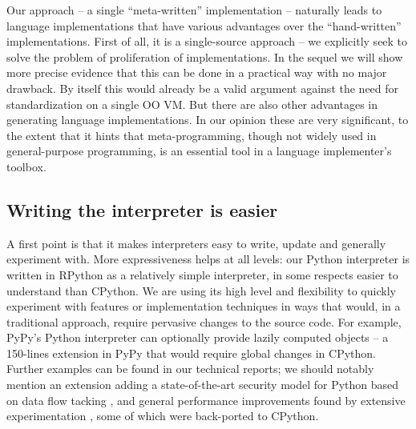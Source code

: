 \documentclass{llncs}
\begin{document}
Our approach – a single ``meta-written'' implementation – naturally leads
to language implementations that have various advantages over the
``hand-written'' implementations.  First of all, it is a single-source
approach – we explicitly seek to solve the problem of proliferation of
implementations.  In the sequel we will show more precise evidence that
this can be done in a practical way with no major drawback.  By itself
this would already be a valid argument against the need for
standardization on a single OO VM.  But there are also other advantages
in generating language implementations. In our opinion these are very
significant, to the extent that it hints that meta-programming, though
not widely used in general-purpose programming, is an essential tool in
a language implementer's toolbox.

\subsection{Writing the interpreter is easier}

A first point is that it makes interpreters easy to write, update and
generally experiment with.  More expressiveness helps at all levels: our
Python interpreter is written in RPython as a relatively simple
interpreter, in some respects easier to understand than CPython.  We are
using its high level and flexibility to quickly experiment with features
or implementation techniques in ways that would, in a traditional
approach, require pervasive changes to the source code.  For example,
PyPy's Python interpreter can optionally provide lazily computed objects
– a 150-lines extension in PyPy that would require global changes in
CPython.  Further examples can be found in our technical reports; we
should notably mention an extension adding a state-of-the-art security
model for Python based on data flow tacking \cite{D12.1}, and general
performance improvements found by extensive experimentation \cite{D06.1}, some
of which were back-ported to CPython.
\end{document}
